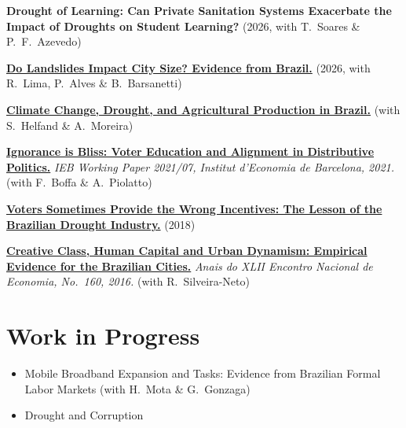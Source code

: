 \documentclass[a4paper,9pt]{article}
\newcommand{\cvgap}{\vspace{2mm}}
\begin{document}
\textbf{Drought of Learning: Can Private Sanitation Systems Exacerbate the Impact of Droughts on Student Learning?} (2026, with T.~Soares \& P.~F.~Azevedo)

\cvgap

\textbf{\href{https://www.researchgate.net/profile/Ricardo-Carvalho-10/publication/383129940_Do_Landslides_Impact_Urbanization_Patterns_Evidence_from_Brazilian_Cities/links/66be0c688d0073559255b1e4/Do-Landslides-Impact-Urbanization-Patterns-Evidence-from-Brazilian-Cities.pdf}{Do Landslides Impact City Size? Evidence from Brazil.}} (2026, with R.~Lima, P.~Alves \& B.~Barsanetti)

\cvgap

\textbf{\href{https://economics.ucr.edu/docs/helfand/Helfand\%20Climate\%20Change,\%20Drought,\%20and\%20Ag\%20Prod\%20in\%20Brazil\%208-2024.pdf}{Climate Change, Drought, and Agricultural Production in Brazil.}} (with S.~Helfand \& A.~Moreira)

\cvgap

\textbf{\href{http://diposit.ub.edu/dspace/handle/2445/182602}{Ignorance is Bliss: Voter Education and Alignment in Distributive Politics.}} \emph{IEB Working Paper 2021/07, Institut d'Economia de Barcelona, 2021.} (with F.~Boffa \& A.~Piolatto)

\cvgap

\textbf{\href{https://mpra.ub.uni-muenchen.de/88317/}{Voters Sometimes Provide the Wrong Incentives: The Lesson of the Brazilian Drought Industry.}} (2018)

\cvgap

\textbf{\href{https://www.researchgate.net/publication/319902513_Creative_Class_Human_Capital_and_Urban_Dynamism_Empirical_Evidence_for_the_Brazilian_Cities}{Creative Class, Human Capital and Urban Dynamism: Empirical Evidence for the Brazilian Cities.}} \emph{Anais do XLII Encontro Nacional de Economia, No.~160, 2016.} (with R.~Silveira-Neto)

\section{Work in Progress}

\begin{itemize}
\item Mobile Broadband Expansion and Tasks: Evidence from Brazilian Formal Labor Markets (with H.~Mota \& G.~Gonzaga)
\item Drought and Corruption
\end{itemize}
\end{document}
